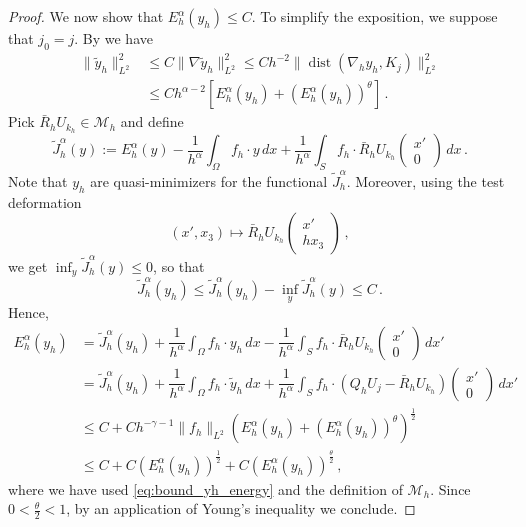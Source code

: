 \documentclass{article}
\theoremstyle{plain}
\theoremstyle{plain}
\theoremstyle{plain}
\theoremstyle{plain}
\theoremstyle{plain}
\theoremstyle{definition}
\theoremstyle{definition}
\DeclareMathOperator{\dist}{dist}
\begin{document}
\begin{proof}
	We now show that $E_h^\alpha(y_h) \leq C$. To simplify the exposition, we suppose that $j_0 = j$. By  we have
	\begin{equation}\label{eq:bound_yh_energy}
		\begin{aligned}
			\|\tilde y_h\|_{L^2}^2 & \leq C \|\nabla \tilde y_h\|_{L^2}^2 \leq Ch^{-2} \|\dist(\nabla_h y_h, K_j)\|^2_{L^2}\\
			& \leq Ch^{\alpha-2}[E_h^{\alpha}(y_h) + (E_h^{\alpha}(y_h))^\theta] \,.
		\end{aligned}
	\end{equation}
	Pick $\bar R_h U_{k_h} \in \mathcal{M}_h$ and define
	\[
	\tilde J^\alpha_h(y) := E^{\alpha}_h(y) - \dfrac{1}{h^\alpha} \int_\Omega f_h \cdot y \, dx + \dfrac{1}{h^\alpha} \int_S f_h \cdot \bar R_h U_{k_h} \begin{pmatrix}
	x' \\ 0
	\end{pmatrix} \, dx \,.
	\]
	Note that $y_h$ are quasi-minimizers for the functional $\tilde J_h^\alpha$. Moreover, using the test deformation
	\[
		(x', x_3) \mapsto \bar R_h U_{k_h}\begin{pmatrix}
		x' \\ hx_3
		\end{pmatrix} \,,
	\]
	we get $\inf_y \tilde J_h^\alpha(y) \leq 0$, so that
	\[
		\tilde J_h^\alpha(y_h) \leq \tilde J_h^{\alpha}(y_h) - \inf_y \tilde J_h^\alpha(y) \leq C \,.
	\]
	Hence,
	\begin{align}
	E_h^\alpha(y_h) & = \tilde J^\alpha_h(y_h) + \dfrac{1}{h^\alpha} \int_\Omega f_h \cdot y_h \, dx - \dfrac{1}{h^\alpha} \int_S f_h \cdot \bar R_h U_{k_h} \begin{pmatrix}
	x' \\ 0
	\end{pmatrix} \, dx' \\
	& = \tilde J^\alpha_h(y_h) + \dfrac{1}{h^\alpha} \int_\Omega f_h \cdot \tilde y_h \, dx + \dfrac{1}{h^\alpha} \int_S f_h \cdot (Q_h U_j  - \bar R_h U_{k_h}) \begin{pmatrix}
	x' \\ 0
	\end{pmatrix} \, dx'\\
	& \leq C + Ch^{-\gamma -1}\|f_h\|_{L^2}(E_h^{\alpha}(y_h) + (E_h^\alpha(y_h))^\theta )^{\frac{1}{2}}\\
	& \leq C + C(E_h^\alpha(y_h))^\frac{1}{2} + C(E_h^\alpha(y_h))^\frac{\theta}{2}\,,
	\end{align}
	where we have used \eqref{eq:bound_yh_energy} and the definition of $\mathcal{M}_h$.
	Since $0 < \frac{\theta}{2} < 1$, by an application of Young's inequality we conclude.
\end{proof}
\end{document}
